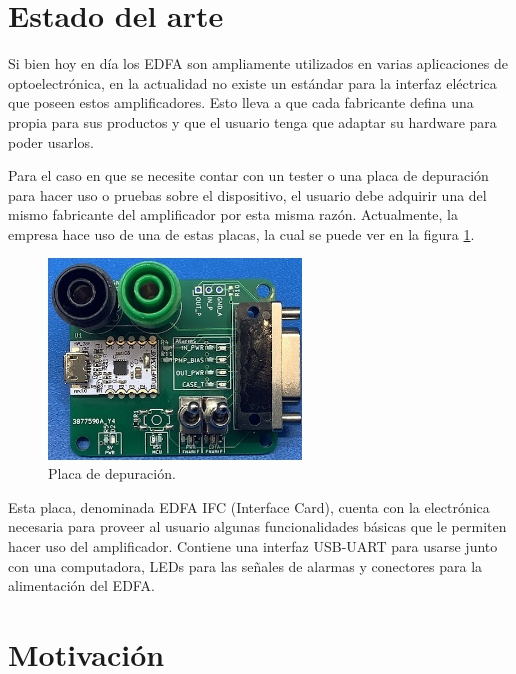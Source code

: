 
\section{Estado del arte}

Si bien hoy en día los EDFA son ampliamente utilizados en varias aplicaciones de optoelectrónica, en la actualidad no existe un estándar para la interfaz eléctrica que poseen estos amplificadores. Esto lleva a que cada fabricante defina una propia para sus productos y que el usuario tenga que adaptar su hardware para poder usarlos.

Para el caso en que se necesite contar con un tester o una placa de depuración para hacer uso o pruebas sobre el dispositivo, el usuario debe adquirir una del mismo fabricante del amplificador por esta misma razón. Actualmente, la empresa hace uso de una de estas placas, la cual se puede ver en la figura \ref{fig:placaDebug}.

\begin{figure}[H]
\centering
\includegraphics[width=0.60\textwidth]{./Figures/placaDebug.jpg}
\caption{Placa de depuración.}
\label{fig:placaDebug}
\end{figure}

Esta placa, denominada EDFA IFC (Interface Card), cuenta con la electrónica necesaria para proveer al usuario algunas funcionalidades básicas que le permiten hacer uso del amplificador. Contiene una interfaz USB-UART para usarse junto con una computadora, LEDs para las señales de alarmas y conectores para la alimentación del EDFA.

\section{Motivación}


